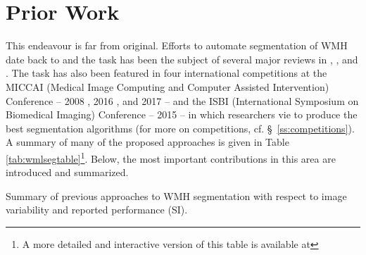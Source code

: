 \section{Prior Work}
This endeavour is far from original. Efforts to automate segmentation of WMH date back to \citeyear{Kapouleas1990} \cite{Kapouleas1990} and the task has been the subject of several major reviews in \citeyear{Llado2012} \cite{Llado2012,Mortazavi2012}, \citeyear{Garcia-Lorenzo2013} \cite{Garcia-Lorenzo2013}, and \citeyear{Caligiuri2015} \cite{Caligiuri2015}. The task has also been featured in four international competitions at the MICCAI (Medical Image Computing and Computer Assisted Intervention) Conference -- 2008 \cite{MSSEG2008}, 2016 \cite{MSSEG2016}, and 2017 \cite{WMHSEG2017} -- and the ISBI (International Symposium on Biomedical Imaging) Conference -- 2015 \cite{MSISBI2015} -- in which researchers vie to produce the best segmentation algorithms (for more on competitions, cf. \S\ \ref{ss:competitions}). A summary of many of the proposed approaches is given in Table \ref{tab:wmlsegtable}\footnote{A more detailed and interactive version of this table is available at }. Below, the most important contributions in this area are introduced and summarized.
\begin{table}
  \caption{Summary of previous approaches to WMH segmentation with respect to image variability and reported performance (SI).}
  \footnotesize{\centering{}}
  \label{tab:wmlsegtable}
\end{table}
